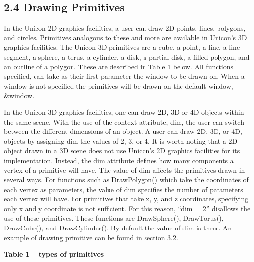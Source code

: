 \documentclass[letterpaper]{article}
\begin{document}
\bigskip

\subsection[2.4 Drawing Primitives]{2.4 Drawing Primitives}

In the Unicon 2D graphics facilities, a user can draw 2D points,
lines, polygons, and circles. Primitives analogous to these and more
are available in Unicon's 3D graphics facilities. The Unicon 3D
primitives are a cube, a point, a line, a line segment, a sphere, a
torus, a cylinder, a disk, a partial disk, a filled polygon, and an
outline of a polygon.  These are described in Table 1 below. All
functions specified, can take as their first parameter the window to
be drawn on. When a window is not specified the primitives will be
drawn on the default window, \textsf{\&window}.

In the Unicon 3D graphics facilities, one can draw 2D, 3D or 4D
objects within the same scene. With the use of the context attribute,
\textsf{dim}, the user can switch between the different dimensions of
an object. A user can draw 2D, 3D, or 4D, objects by assigning
\textsf{dim} the values of 2, 3, or 4. It is worth noting that a 2D
object drawn in a 3D scene does not use Unicon's 2D graphics
facilities for its implementation. Instead, the \textsf{dim}
attribute defines how many components a vertex of a primitive will
have. The value of \textsf{dim} affects the primitives drawn in
several ways. For functions such as \textsf{DrawPolygon()} which take
the coordinates of each vertex as parameters, the value of
\textsf{dim} specifies the number of parameters each vertex will
have. For primitives that take x, y, and z coordinates, specifying
only x and y coordinate is not sufficient. For this reason,
\textsf{{}``dim = 2''} disallows the use of these primitives. These
functions are
\textsf{DrawSphere(), DrawTorus(), DrawCube(), and DrawCylinder()}.
By default the value of \textsf{dim} is
three. An example of drawing primitive can be found in section 3.2.


\bigskip

{\centering{}\bfseries
Table 1 -- types of primitives
\par}
\end{document}
